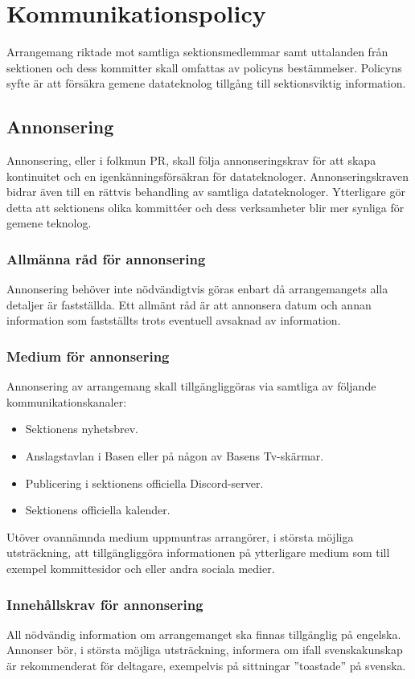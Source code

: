 \section{Kommunikationspolicy}
Arrangemang riktade mot samtliga sektionsmedlemmar samt uttalanden från sektionen och dess kommitter skall omfattas av policyns bestämmelser. Policyns syfte är att försäkra gemene datateknolog tillgång till sektionsviktig information.

\subsection{Annonsering}
Annonsering, eller i folkmun PR, skall följa annonseringskrav för att skapa kontinuitet
och en igenkänningsförsäkran för datateknologer. Annonseringskraven bidrar även till en
rättvis behandling av samtliga datateknologer. Ytterligare gör detta att sektionens olika
kommittéer och dess verksamheter blir mer synliga för gemene teknolog.

\subsubsection{Allmänna råd för annonsering}
Annonsering behöver inte nödvändigtvis göras enbart då arrangemangets alla detaljer är
fastställda. Ett allmänt råd är att annonsera datum och annan information som fastställts
trots eventuell avsaknad av information.

\subsubsection{Medium för annonsering}
Annonsering av arrangemang skall tillgängliggöras via samtliga av följande kommunikationskanaler:
\begin{itemize}
    \item Sektionens nyhetsbrev.
    \item Anslagstavlan i Basen eller på någon av Basens Tv-skärmar.
    \item Publicering i sektionens officiella Discord-server.
    \item Sektionens officiella kalender.
\end{itemize}
Utöver ovannämnda medium uppmuntras arrangörer, i största möjliga utsträckning, att
tillgängliggöra informationen på ytterligare medium som till exempel kommittesidor och
 eller andra sociala medier.

\subsubsection{Innehållskrav för annonsering}
All nödvändig information om arrangemanget ska finnas tillgänglig på engelska. Annonser
bör, i största möjliga utsträckning, informera om ifall svenskakunskap är rekommenderat
för deltagare, exempelvis på sittningar ”toastade” på svenska.

